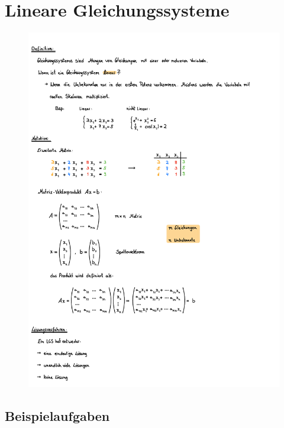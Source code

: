 \section{Lineare Gleichungssysteme}
\begin{figure}[h!]
    \includegraphics[page=1, scale=0.842]{pdf/01_Lineare_Gleichungssysteme.pdf}
\end{figure}
\newpage

            
\subsection{Beispielaufgaben}
\vspace{1cm}

